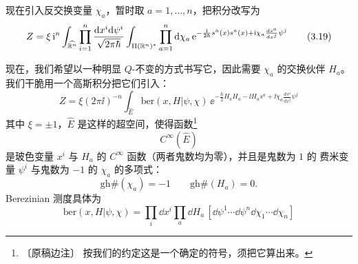 现在引入反交换变量 $\chi_a$，暂时取 $a=1,\dots,n$，把积分改写为
\begin{equation}
Z = \xi\,\mathrm{i}^n\int_{\widehat{\mathbb{R}^n}}\prod_{i=1}^{n}
\frac{\mathrm{d} x^i\mathrm{d}\psi^i}{\sqrt{2\pi\hbar}}
\int_{\Pi(\mathbb{R}^n)^{\ast}}\prod_{a=1}^{n}\mathrm{d}\chi_a\,
\mathrm{e}^{-\frac{1}{2\hbar}s^a(x)s^a(x)+\mathrm{i}\chi_a\frac{ds^a}{dx^j}\psi^j}
\tag{3.19}
\end{equation}

现在，我们希望以一种明显 $Q$-不变的方式书写它，因此需要 $\chi_a$ 的交换伙伴
$H_a$。我们干脆用一个高斯积分把它们引入：
\begin{equation}
Z = \xi(2\pi\ii)^{-n}\int_{\widehat E}\mathrm{ber}(x,H|\psi,\chi)\,
\ee^{-\frac{\hbar}{2}H_aH_a-\ii H_as^a+\ii\chi_a\frac{ds^a}{dx^j}\psi^j}
\tag{3.20}
\end{equation}
其中 $\xi=\pm1$，$\widehat E$ 是这样的超空间，使得函数\footnote{〔原稿边注〕
按我们的约定这是一个确定的符号，须把它算出来。}
\begin{equation}
C^{\infty}(\widehat E)
\tag{3.21}
\end{equation}
是玻色变量 $x^i$ 与 $H_a$ 的 $C^{\infty}$ 函数（两者鬼数均为零），并且是鬼数为 $1$ 的
费米变量 $\psi^i$ 与鬼数为 $-1$ 的 $\chi_a$ 的多项式：
\begin{equation}
\mathrm{gh}\#(\chi_a) = -1 \qquad \mathrm{gh}\#(H_a) = 0.
\tag{3.22}
\end{equation}
Berezinian 测度具体为
\begin{equation}
\mathrm{ber}(x,H|\psi,\chi) = \prod_i\dd x^i\prod_a\dd H_a\,
[\dd\psi^1\cdots\dd\psi^n\dd\chi_1\cdots\dd\chi_n]
\tag{3.23}
\end{equation}

